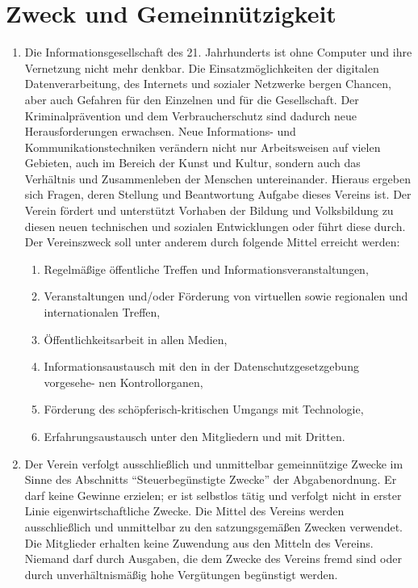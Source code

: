\documentclass[ngerman]{scrartcl}
\begin{document}
\section{Zweck und Gemeinnützigkeit} \label{sec:zweck}
\begin{enumerate}
 \item Die Informationsgesellschaft des 21. Jahrhunderts ist ohne Computer und ihre Vernetzung nicht mehr denkbar. Die Einsatzmöglichkeiten der digitalen Datenverarbeitung, des Internets und sozialer Netzwerke bergen Chancen, aber auch Gefahren für den Einzelnen und für die Gesellschaft. Der Kriminalprävention und dem Verbraucherschutz sind dadurch neue Herausforderungen erwachsen. Neue Informations- und Kommunikationstechniken verändern nicht nur Arbeitsweisen auf vielen Gebieten, auch im Bereich der Kunst und Kultur, sondern auch das Verhältnis und Zusammenleben der Menschen untereinander. Hieraus ergeben sich Fragen, deren Stellung und Beantwortung Aufgabe dieses Vereins ist.
Der Verein fördert und unterstützt Vorhaben der Bildung und Volksbildung zu diesen neuen technischen und sozialen Entwicklungen oder führt diese durch.
Der Vereinszweck soll unter anderem durch folgende Mittel erreicht werden:
\begin{enumerate}
\item Regelmäßige öffentliche Treffen und Informationsveranstaltungen,
\item  Veranstaltungen und/oder Förderung von virtuellen sowie regionalen und internationalen Treffen,
\item  Öffentlichkeitsarbeit in allen Medien,
\item  Informationsaustausch mit den in der Datenschutzgesetzgebung vorgesehe- nen Kontrollorganen,
\item  Förderung des schöpferisch-kritischen Umgangs mit Technologie,
\item  Erfahrungsaustausch unter den Mitgliedern und mit Dritten.\
\end{enumerate}
\item Der Verein verfolgt ausschließlich und unmittelbar gemeinnützige Zwecke 
im Sinne des Abschnitts ``Steuerbegünstigte Zwecke'' der Abgabenordnung. 
Er darf keine Gewinne erzielen; er ist selbstlos tätig und verfolgt 
nicht in erster Linie eigenwirtschaftliche Zwecke. Die Mittel des Vereins werden ausschließlich und unmittelbar zu den satzungsgemäßen 
Zwecken verwendet. Die Mitglieder erhalten keine Zuwendung aus den 
Mitteln des Vereins. Niemand darf durch Ausgaben, die dem Zwecke des 
Vereins fremd sind oder durch unverhältnismäßig hohe Vergütungen begünstigt werden.
\end{enumerate}
\end{document}
